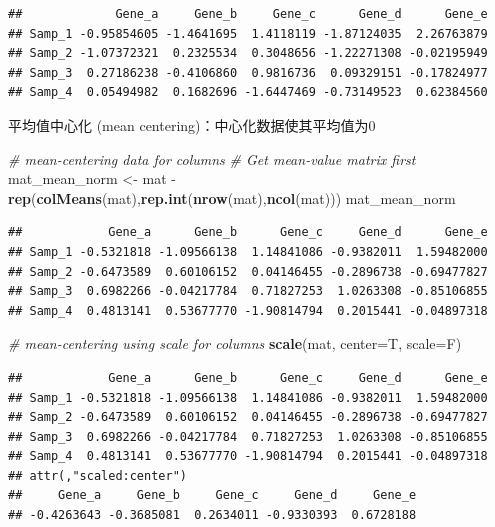 \documentclass[]{article}
\newenvironment{Shaded}{\begin{snugshade}}{\end{snugshade}}
\newcommand{\KeywordTok}[1]{\textcolor[rgb]{0.13,0.29,0.53}{\textbf{{#1}}}}
\newcommand{\DataTypeTok}[1]{\textcolor[rgb]{0.13,0.29,0.53}{{#1}}}
\newcommand{\StringTok}[1]{\textcolor[rgb]{0.31,0.60,0.02}{{#1}}}
\newcommand{\CommentTok}[1]{\textcolor[rgb]{0.56,0.35,0.01}{\textit{{#1}}}}
\newcommand{\NormalTok}[1]{{#1}}
\numberwithin{figure}{section}
\numberwithin{table}{section}
\theoremstyle{definition}
\theoremstyle{definition}
\theoremstyle{definition}
\theoremstyle{remark}
\begin{document}
\begin{verbatim}
##             Gene_a     Gene_b     Gene_c      Gene_d      Gene_e
## Samp_1 -0.95854605 -1.4641695  1.4118119 -1.87124035  2.26763879
## Samp_2 -1.07372321  0.2325534  0.3048656 -1.22271308 -0.02195949
## Samp_3  0.27186238 -0.4106860  0.9816736  0.09329151 -0.17824977
## Samp_4  0.05494982  0.1682696 -1.6447469 -0.73149523  0.62384560
\end{verbatim}

平均值中心化 (mean centering)：中心化数据使其平均值为0

\begin{Shaded}
\begin{Highlighting}[]
\CommentTok{# mean-centering data for columns}
\CommentTok{# Get mean-value matrix first}
\NormalTok{mat_mean_norm <-}\StringTok{ }\NormalTok{mat -}\StringTok{ }\KeywordTok{rep}\NormalTok{(}\KeywordTok{colMeans}\NormalTok{(mat),}\KeywordTok{rep.int}\NormalTok{(}\KeywordTok{nrow}\NormalTok{(mat),}\KeywordTok{ncol}\NormalTok{(mat)))}
\NormalTok{mat_mean_norm}
\end{Highlighting}
\end{Shaded}

\begin{verbatim}
##            Gene_a      Gene_b      Gene_c     Gene_d      Gene_e
## Samp_1 -0.5321818 -1.09566138  1.14841086 -0.9382011  1.59482000
## Samp_2 -0.6473589  0.60106152  0.04146455 -0.2896738 -0.69477827
## Samp_3  0.6982266 -0.04217784  0.71827253  1.0263308 -0.85106855
## Samp_4  0.4813141  0.53677770 -1.90814794  0.2015441 -0.04897318
\end{verbatim}

\begin{Shaded}
\begin{Highlighting}[]
\CommentTok{# mean-centering using scale for columns}
\KeywordTok{scale}\NormalTok{(mat, }\DataTypeTok{center=}\NormalTok{T, }\DataTypeTok{scale=}\NormalTok{F)}
\end{Highlighting}
\end{Shaded}

\begin{verbatim}
##            Gene_a      Gene_b      Gene_c     Gene_d      Gene_e
## Samp_1 -0.5321818 -1.09566138  1.14841086 -0.9382011  1.59482000
## Samp_2 -0.6473589  0.60106152  0.04146455 -0.2896738 -0.69477827
## Samp_3  0.6982266 -0.04217784  0.71827253  1.0263308 -0.85106855
## Samp_4  0.4813141  0.53677770 -1.90814794  0.2015441 -0.04897318
## attr(,"scaled:center")
##     Gene_a     Gene_b     Gene_c     Gene_d     Gene_e 
## -0.4263643 -0.3685081  0.2634011 -0.9330393  0.6728188
\end{verbatim}
\end{document}

